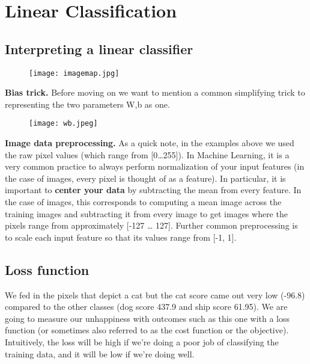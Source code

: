 \documentclass{report}
\begin{document}
	\newpage
	
	\section{Linear Classification}
	
	\subsection{Interpreting a linear classifier}
	
	\begin{figure}[h]
		\texttt{[image: imagemap.jpg]}
	\end{figure}
	
	\textbf{Bias trick.} Before moving on we want to mention a common simplifying trick to representing the two parameters W,b as one. \\
	
	\begin{figure}[h]
		\texttt{[image: wb.jpeg]}
	\end{figure}


	\textbf{Image data preprocessing.} As a quick note, in the examples above we used the raw pixel values (which range from [0…255]). In Machine Learning, it is a very common practice to always perform normalization of your input features (in the case of images, every pixel is thought of as a feature). In particular, it is important to \textbf{center your data} by subtracting the mean from every feature. In the case of images, this corresponds to computing a mean image across the training images and subtracting it from every image to get images where the pixels range from approximately [-127 … 127]. Further common preprocessing is to scale each input feature so that its values range from [-1, 1].
	
	\subsection{Loss function}

	We fed in the pixels that depict a cat but the cat score came out very low (-96.8) compared to the other classes (dog score 437.9 and ship score 61.95). We are going to measure our unhappiness with outcomes such as this one with a loss function (or sometimes also referred to as the cost function or the objective). Intuitively, the loss will be high if we’re doing a poor job of classifying the training data, and it will be low if we’re doing well.
\end{document}
